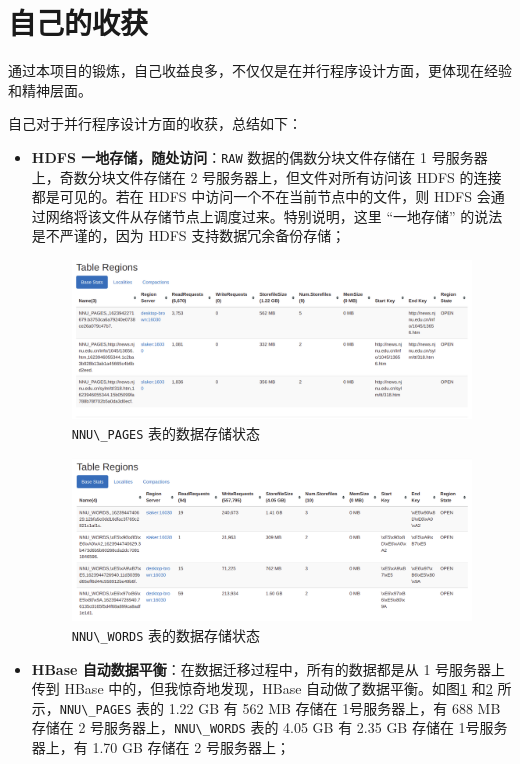 \documentclass{ctexart}
\newcommand{\code}[1]{\colorbox{backcolor}{\lstinline|#1|}}
\begin{document}
    \section{自己的收获}\label{sec:achievement}

    通过本项目的锻炼，自己收益良多，不仅仅是在并行程序设计方面，更体现在经验和精神层面。

    自己对于并行程序设计方面的收获，总结如下：

    \begin{itemize}
        \item \textbf{HDFS 一地存储，随处访问}：\code{RAW} 数据的偶数分块文件存储在 1 号服务器上，奇数分块文件存储在 2 号服务器上，但文件对所有访问该 HDFS 的连接都是可见的。若在 HDFS 中访问一个不在当前节点中的文件，则 HDFS 会通过网络将该文件从存储节点上调度过来。特别说明，这里 “一地存储” 的说法是不严谨的，因为 HDFS 支持数据冗余备份存储；

        \begin{figure}[!h]
            \centering
            \includegraphics[width=\textwidth]{src/achievement_nnu-pages}
            \caption{\code{NNU\_PAGES} 表的数据存储状态}
            \label{fig:achievement_nnu-pages}
        \end{figure}

        \begin{figure}[!h]
            \centering
            \includegraphics[width=\textwidth]{src/achievement_nnu-words}
            \caption{\code{NNU\_WORDS} 表的数据存储状态}
            \label{fig:achievement_nnu-words}
        \end{figure}

        \item \textbf{HBase 自动数据平衡}：在数据迁移过程中，所有的数据都是从 1 号服务器上传到 HBase 中的，但我惊奇地发现，HBase 自动做了数据平衡。如图\ref{fig:achievement_nnu-pages} 和\ref{fig:achievement_nnu-words} 所示，\code{NNU\_PAGES} 表的 1.22 GB 有 562 MB 存储在 1号服务器上，有 688 MB 存储在 2 号服务器上，\code{NNU\_WORDS} 表的 4.05 GB 有 2.35 GB 存储在 1号服务器上，有 1.70 GB 存储在 2 号服务器上；
    \end{itemize}
\end{document}
